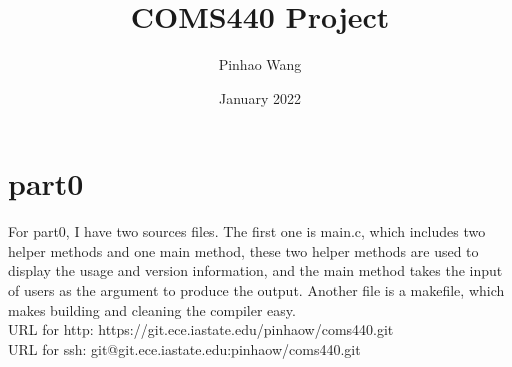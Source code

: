 \documentclass{article}
\title{COMS440 Project}
\author{Pinhao Wang }
\date{January 2022}
\begin{document}
\maketitle

\section{part0}
For part0, I have two sources files. The first one is main.c, which includes two helper methods and one main method, these two helper methods are used to display the usage and version information, and the main method takes the input of users as the argument to produce the output. Another file is a makefile, which makes building and cleaning the compiler easy.\\
URL for http: https://git.ece.iastate.edu/pinhaow/coms440.git\\
URL for ssh: git@git.ece.iastate.edu:pinhaow/coms440.git
\end{document}
